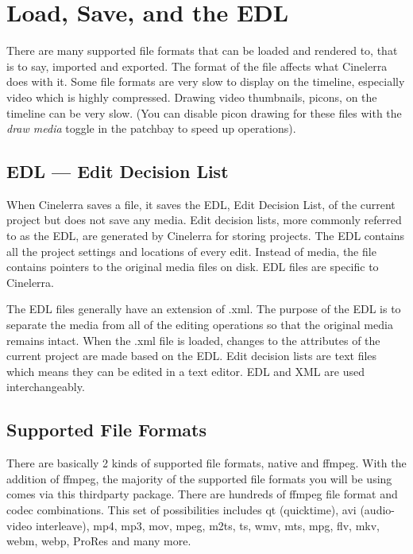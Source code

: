 \chapter{Load, Save, and the EDL}%
\label{cha:load_save_and_the_EDL}

There are many supported file formats that can be loaded and rendered to, that is to say, imported and exported. 
The format of the file affects what Cinelerra does with it.  
Some file formats are very slow to display on the timeline, especially video which is highly compressed.  
Drawing video thumbnails, picons, on the timeline can be very slow.  (You can disable picon drawing for these files with the \textit{draw media} toggle in the patchbay to speed up operations).

\section{EDL --- Edit Decision List}%
\label{sec:edl_edit_decision_list}

When Cinelerra saves a file, it saves the EDL, Edit Decision List, of the current project but does not save any media. 
Edit decision lists, more commonly referred to as the EDL, are generated by Cinelerra for storing projects.  
The EDL contains all the project settings and locations of every edit. 
Instead of media, the file contains pointers to the original media files on disk.  
EDL files are specific to Cinelerra.    

The EDL files generally have an extension of .xml.  
The purpose of the EDL is to separate the media from all of the editing operations so that the original media remains intact. 
When the .xml file is loaded, changes to the attributes of the current project are made based on the EDL. Edit decision lists are text files which means they can be edited in a text editor.  EDL and XML are used interchangeably.

\section{Supported File Formats}%
\label{sec:supported_file_formats}

There are basically 2 kinds of supported file formats, native and ffmpeg.  With the addition of ffmpeg, the majority of the supported file formats you will be using comes via this thirdparty package.  There are hundreds of ffmpeg file format and codec combinations. This set of possibilities includes qt (quicktime), avi (audio-video interleave),  mp4, mp3, mov, mpeg, m2ts, ts, wmv, mts, mpg, flv, mkv, webm, webp, ProRes and many more.

